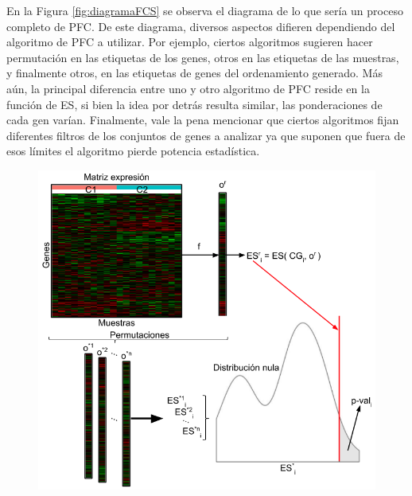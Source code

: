 \documentclass[12pt,twoside]{reedthesis}
\begin{document}
En la Figura \ref{fig:diagramaFCS} se observa el diagrama de lo que sería un proceso completo de PFC. De este diagrama, diversos aspectos difieren dependiendo del algoritmo de PFC a utilizar. Por ejemplo, ciertos algoritmos sugieren hacer permutación en las etiquetas de los genes, otros en las etiquetas de las muestras, y finalmente otros, en las etiquetas de genes del ordenamiento generado. Más aún, la principal diferencia entre uno y otro algoritmo de PFC reside en la función de ES, si bien la idea por detrás resulta similar, las ponderaciones de cada gen varían. Finalmente, vale la pena mencionar que ciertos algoritmos fijan diferentes filtros de los conjuntos de genes a analizar ya que suponen que fuera de esos límites el algoritmo pierde potencia estadística.
\begin{figure}

{\centering \includegraphics[width=1\linewidth]{images/diagrama_FCS} 

}


\end{figure}
\end{document}
